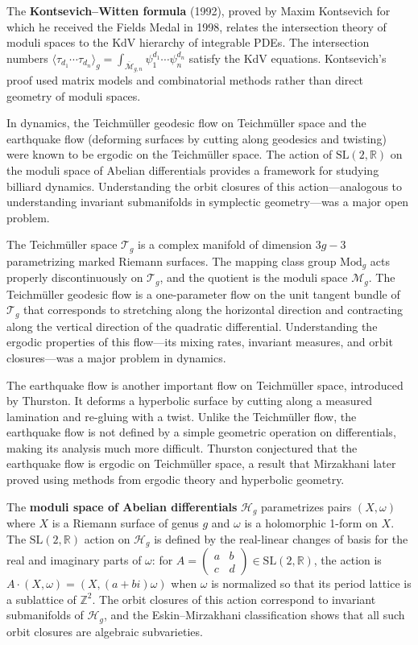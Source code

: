 The \textbf{Kontsevich--Witten formula} (1992), proved by Maxim Kontsevich for which he received the Fields Medal in 1998, relates the intersection theory of moduli spaces to the KdV hierarchy of integrable PDEs. The intersection numbers $\langle\tau_{d_1}\cdots\tau_{d_n}\rangle_g = \int_{\overline{\mathcal{M}}_{g,n}}\psi_1^{d_1}\cdots\psi_n^{d_n}$ satisfy the KdV equations. Kontsevich's proof used matrix models and combinatorial methods rather than direct geometry of moduli spaces.

In dynamics, the Teichm\"uller geodesic flow on Teichm\"uller space and the earthquake flow (deforming surfaces by cutting along geodesics and twisting) were known to be ergodic on the Teichm\"uller space. The action of $\mathrm{SL}(2,\mathbb{R})$ on the moduli space of Abelian differentials provides a framework for studying billiard dynamics. Understanding the orbit closures of this action---analogous to understanding invariant submanifolds in symplectic geometry---was a major open problem.

The Teichm\"uller space $\mathcal{T}_g$ is a complex manifold of dimension $3g-3$ parametrizing marked Riemann surfaces. The mapping class group $\mathrm{Mod}_g$ acts properly discontinuously on $\mathcal{T}_g$, and the quotient is the moduli space $\mathcal{M}_g$. The Teichm\"uller geodesic flow is a one-parameter flow on the unit tangent bundle of $\mathcal{T}_g$ that corresponds to stretching along the horizontal direction and contracting along the vertical direction of the quadratic differential. Understanding the ergodic properties of this flow---its mixing rates, invariant measures, and orbit closures---was a major problem in dynamics.

The earthquake flow is another important flow on Teichm\"uller space, introduced by Thurston. It deforms a hyperbolic surface by cutting along a measured lamination and re-gluing with a twist. Unlike the Teichm\"uller flow, the earthquake flow is not defined by a simple geometric operation on differentials, making its analysis much more difficult. Thurston conjectured that the earthquake flow is ergodic on Teichm\"uller space, a result that Mirzakhani later proved using methods from ergodic theory and hyperbolic geometry.

The \textbf{moduli space of Abelian differentials} $\mathcal{H}_g$ parametrizes pairs $(X, \omega)$ where $X$ is a Riemann surface of genus $g$ and $\omega$ is a holomorphic 1-form on $X$. The $\mathrm{SL}(2,\mathbb{R})$ action on $\mathcal{H}_g$ is defined by the real-linear changes of basis for the real and imaginary parts of $\omega$: for $A = \begin{pmatrix} a & b \\ c & d \end{pmatrix} \in \mathrm{SL}(2,\mathbb{R})$, the action is $A \cdot (X, \omega) = (X, (a + bi)\omega)$ when $\omega$ is normalized so that its period lattice is a sublattice of $\mathbb{Z}^2$. The orbit closures of this action correspond to invariant submanifolds of $\mathcal{H}_g$, and the Eskin--Mirzakhani classification shows that all such orbit closures are algebraic subvarieties.

